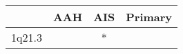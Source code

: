 \begin{tabular}{lccc}
\toprule
{} & AAH & AIS & Primary \\
\midrule
1q21.3 &     &   * &         \\
\bottomrule
\end{tabular}
